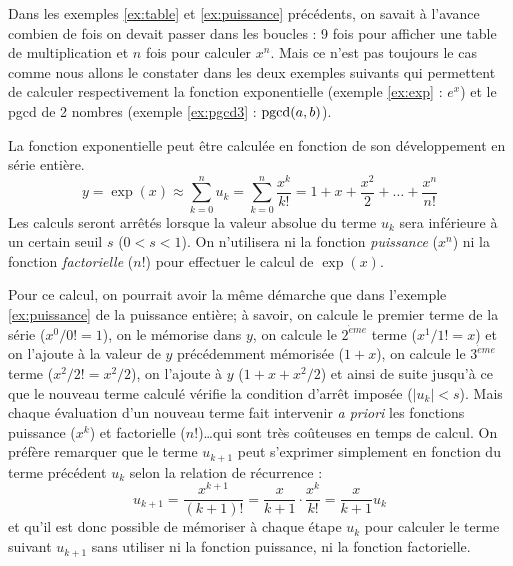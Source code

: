Dans les exemples \ref{ex:table} et \ref{ex:puissance} précédents, on savait à l'avance
combien de fois on devait passer dans les boucles : 9 fois pour afficher une table de 
multiplication et $n$ fois pour calculer $x^n$. Mais ce n'est pas toujours le cas comme 
nous allons le constater dans les deux exemples suivants qui permettent de calculer 
respectivement la fonction exponentielle (exemple \ref{ex:exp} : $e^x$) 
et le pgcd de 2 nombres (exemple \ref{ex:pgcd3} : ${\rm pgcd}(a,b)$).

\begin{ex}\label{ex:exp}
La fonction exponentielle peut être calculée en fonction de son d\'eveloppement 
en série entière. 
$$\displaystyle y = \exp(x) \approx \sum_{k=0}^{n} u_k = \sum_{k=0}^{n} \frac{x^{k}}{k!} = 
	1 + x + \frac{x^2}{2} + \ldots + \frac{x^{n}}{n!}$$
Les calculs seront arr\^et\'es lorsque la valeur absolue du terme $u_k$ sera inf\'erieure 
\`a un certain seuil $s$ ($0 < s < 1$). On n'utilisera ni la fonction {\em puissance} ($x^n$) 
ni la fonction {\em facto\-riel\-le} ($n!$) pour effectuer le calcul de $\exp(x)$.
\end{ex}
\noindent Pour ce calcul, on pourrait avoir la même démarche que dans l'exemple \ref{ex:puissance}
de la puissance entière; à savoir, on calcule le premier terme
de la série ($x^0/0! = 1$), on le mémorise dans $y$, on calcule le $2^{\grave eme}$ terme ($x^1/1! = x$) 
et on l'ajoute à la valeur de $y$ précédemment mémorisée ($1 + x$), on calcule le $3^{\grave eme}$ 
terme ($x^2/2! = x^2/2$), on l'ajoute à $y$ ($1 + x + x^2/2$) et ainsi de suite jusqu'à ce que 
le nouveau terme calculé vérifie la 
condition d'arrêt imposée ($|u_k| < s$). Mais chaque évaluation d'un nouveau terme fait intervenir 
{\em a priori} les fonctions puissance ($x^k$) et factorielle ($n!$)\ldots qui sont très coûteuses 
en temps de calcul. On préfère remarquer que le terme $u_{k+1}$ peut s'exprimer simplement en 
fonction du terme précédent $u_k$ selon la relation de récurrence :
$$u_{k+1} = \frac{x^{k+1}}{(k+1)!} = \frac{x}{k+1}\cdot\frac{x^{k}}{k!} = \frac{x}{k+1}u_k$$
et qu'il est donc possible de mémoriser à chaque étape $u_k$ pour calculer le terme suivant 
$u_{k+1}$ sans utiliser ni la fonction puissance, ni la fonction factorielle. 
